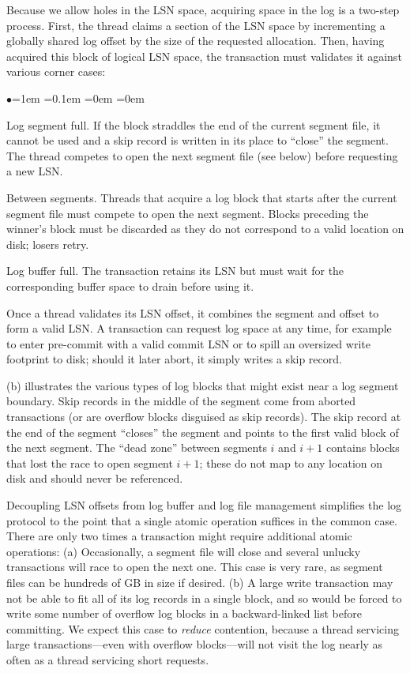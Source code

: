 Because we allow holes in the LSN space, acquiring space in the log is a two-step process. First, the thread claims a section of the LSN space by incrementing a globally shared log offset by the size of the requested allocation. Then, having acquired this block of logical LSN space, the transaction must validates it against various corner cases:

\begin{list}{$\bullet$}{\leftmargin=1em}
  \itemsep=0.1em
  \parsep=0em
  \parskip=0em
\item Log segment full. If the block straddles the end of the current segment file, it cannot be used and a skip record is written in its place to ``close'' the segment. The thread competes to open the next segment file (see below) before requesting a new LSN.
\item Between segments. Threads that acquire a log block that starts after the current segment file must compete to open the next segment. Blocks preceding the winner's block must be discarded as they do not correspond to a valid location on disk; losers retry.
\item Log buffer full. The transaction retains its LSN but must wait for the corresponding buffer space to drain before using it.
\end{list}

Once a thread validates its LSN offset, it combines the segment and offset to form a valid LSN. A transaction can request log space at any time, for example to enter pre-commit with a valid commit LSN or to spill an oversized write footprint to disk; should it later abort, it simply writes a skip record.

(b) illustrates the various types of log blocks that might exist near a log segment boundary. Skip records in the middle of the segment come from aborted transactions (or are overflow blocks disguised as skip records). The skip record at the end of the segment ``closes'' the segment and points to the first valid block of the next segment. The ``dead zone'' between segments $i$ and $i+1$ contains blocks that lost the race to open segment $i+1$; these do not map to any location on disk and should never be referenced. 

Decoupling LSN offsets from log buffer and log file management simplifies the log protocol to the point that a single atomic operation suffices in the common case. There are only two times a transaction might require additional atomic operations: (a) Occasionally, a segment file will close and several unlucky transactions will race to open the next one. This case is very rare, as segment files can be hundreds of GB in size if desired. (b) A large write transaction may not be able to fit all of its log records in a single block, and so would be forced to write some number of overflow log blocks in a backward-linked list before committing. We expect this case to {\em reduce} contention, because a thread servicing large transactions---even with overflow blocks---will not visit the log nearly as often as a thread servicing short requests.

